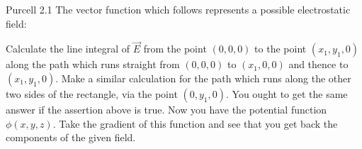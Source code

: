 \documentclass{esg8022pset}
\begin{document}
\begin{problem}{Purcell 2.1}
  The vector function which follows represents a possible electrostatic field:


  Calculate the line integral of $\vec E$ from the point $(0, 0, 0)$ to the point $(x_1, y_1, 0)$ along the path which runs straight from $(0, 0, 0)$ to $(x_1, 0, 0)$ and thence to $(x_1, y_1, 0)$. Make a similar calculation for the path which runs along the other two sides of the rectangle, via the point $(0, y_1, 0)$. You ought to get the same answer if the assertion above is true. Now you have the potential function $\phi(x, y, z)$. Take the gradient of this function and see that you get back the components of the given field.
\end{problem}
\end{document}
